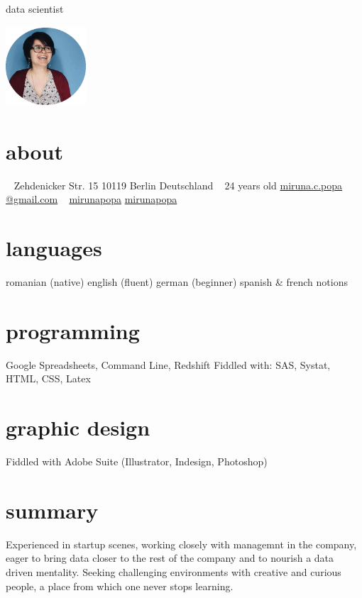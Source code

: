 \documentclass[]{friggeri-cv}
\begin{document}
       {data scientist}

\begin{aside}
  \includegraphics[width = 3cm, height = 3cm, keepaspectratio=true]{imageedit_3_7763302292.png}
  ~
  \section{about}
  ~
    Zehdenicker Str. 15
    10119 Berlin
    Deutschland
    ~
    {24 years old}
    {\color{lightgray} \faEnvelope \href{mailto:miruna.c.popa@gmail.com} {  miruna.c.popa\\@gmail.com}}
    {\color{lightgray} }
    ~
    {\color{lightgray} \faGithub \href{https://www.github.com/mirunapopa} {  mirunapopa}}
    {\color{lightgray} \faLinkedin \href{https://www.linkedin.com/in/mirunapopa}{   mirunapopa}}
    ~
  \section{languages}
    romanian (native)
    english (fluent)
    german (beginner)
    spanish \& french notions
  ~
  \section{programming}
    {\color{red}  }
    {Google Spreadsheets, Command Line, Redshift}
    {Fiddled with: SAS, Systat, HTML, CSS, Latex}
  ~
  \section{graphic design}
    {Fiddled with Adobe Suite (Illustrator, Indesign, Photoshop)}
\end{aside}

\section{summary}

Experienced in startup scenes, working closely with managemnt in the company, eager to bring data closer to the rest of the company and to nourish a data driven mentality. Seeking challenging environments with creative and curious people, a place from which one never stops learning. 
\end{document}
